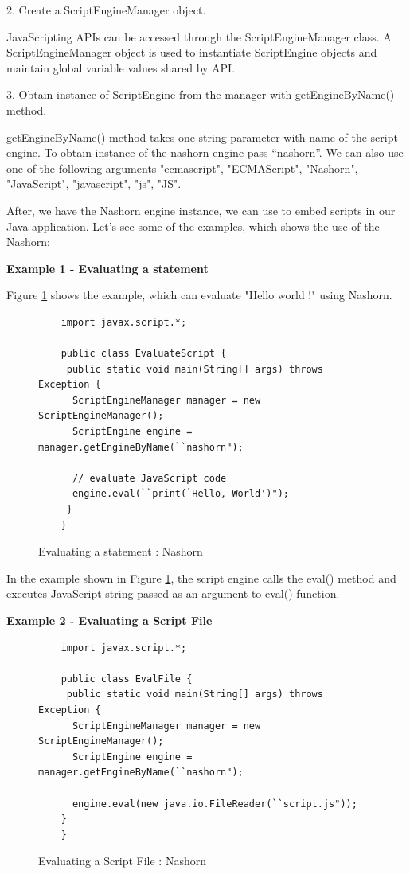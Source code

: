 2.	Create a ScriptEngineManager object.

JavaScripting APIs can be accessed through the ScriptEngineManager class. A ScriptEngineManager object is used to instantiate ScriptEngine objects and maintain global variable values shared by API. 

3.	Obtain instance of ScriptEngine from the manager with getEngineByName() method.

getEngineByName() method takes one string parameter with name of the script engine. To obtain instance of the nashorn engine pass “nashorn”. We can also use one of the following arguments "ecmascript", "ECMAScript", "Nashorn", "JavaScript", "javascript", "js", "JS".
 
After, we have the Nashorn engine instance, we can use to embed scripts in our Java application. Let's see some of the examples, which shows the use of the Nashorn:

\textbf{Example 1 - Evaluating a statement}

Figure \ref{fig:nashornevalastatement} shows the example, which can evaluate "Hello world !" using Nashorn.

\begin{figure}[ht]
	\begin{lstlisting}
	import javax.script.*;
	
	public class EvaluateScript {
	 public static void main(String[] args) throws Exception {
	  ScriptEngineManager manager = new ScriptEngineManager();
	  ScriptEngine engine = manager.getEngineByName(``nashorn");
	
	  // evaluate JavaScript code
	  engine.eval(``print(`Hello, World')");
	 }
	}
	\end{lstlisting}
	\caption{Evaluating a statement : Nashorn}
	\label{fig:nashornevalastatement}
\end{figure}

In the example shown in Figure \ref{fig:nashornevalastatement}, the script engine calls the eval() method and executes JavaScript string passed as an argument to eval() function. 

\textbf{Example 2 - Evaluating a Script File}


\begin{figure}[ht]
	\begin{lstlisting}
	import javax.script.*;
	
	public class EvalFile {
	 public static void main(String[] args) throws Exception {
	  ScriptEngineManager manager = new ScriptEngineManager();
	  ScriptEngine engine = manager.getEngineByName(``nashorn");
	
	  engine.eval(new java.io.FileReader(``script.js"));
	}
	}
	\end{lstlisting}
	\caption{Evaluating a Script File : Nashorn}
	\label{fig:nashornevalafile}
\end{figure}


